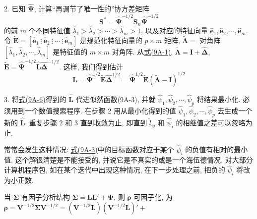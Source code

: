 2. 已知 $\hat{\boldsymbol{\Psi}}$, 计算“再调节了唯一性的”协方差矩阵
\label{eq:9A-5}
\begin{equation}
\mathbf{S}^{*}=\hat{\boldsymbol{\Psi}}^{-1/2}\mathbf{S}_n\hat{\boldsymbol{\Psi}}^{-1/2} \tag{9A-5}
\end{equation}
的前 $m$ 个不同特征值 $\hat{\lambda}_1>\hat{\lambda}_2>\cdots>\hat{\lambda}_m>1$, 以及对应的特征向量 $\hat{\mathbf{e}}_1,\hat{\mathbf{e}}_2,\cdots,\hat{\mathbf{e}}_m$. 令 $\tilde{\mathbf{E}}=[\hat{\mathbf{e}}_1\ \vdots\ \hat{\mathbf{e}}_2\ \vdots\ \cdots\ \vdots\ \hat{\mathbf{e}}_m]$ 是规范化特征向量的 $p\times m$ 矩阵, $\tilde{\boldsymbol{\Lambda}}=$ 对角阵$[\hat{\lambda}_1,\hat{\lambda}_2,\cdots,\hat{\lambda}_m]$ 是特征值的 $m\times m$ 对角阵. 从\hyperref[eq:9A-1]{式(9A-1)}, $\tilde{\boldsymbol{\Lambda}}=\mathbf{I}+\hat{\boldsymbol{\Delta}}$, $\tilde{\mathbf{E}}=\hat{\boldsymbol{\Psi}}^{-1/2}\hat{\mathbf{L}}\hat{\boldsymbol{\Delta}}^{-1/2}$. 这样, 我们得到估计
\label{eq:9A-6}
\begin{equation}
\hat{\mathbf{L}}=\hat{\boldsymbol{\Psi}}^{1/2}\tilde{\mathbf{E}}\hat{\boldsymbol{\Delta}}^{1/2}=\hat{\boldsymbol{\Psi}}^{1/2}\tilde{\mathbf{E}}(\tilde{\boldsymbol{\Lambda}}-\mathbf{I})^{1/2} \tag{9A-6}
\end{equation}

3. 将\hyperref[eq:9A-6]{式(9A-6)}得到的 $\hat{\mathbf{L}}$ 代进似然函数(9A-3), 并就 $\hat{\psi}_1,\hat{\psi}_2,\cdots,\hat{\psi}_p$ 将结果最小化. 必须用到一个数值搜索程序. 在步骤 2 用从最小化得到的值 $\hat{\psi}_1,\hat{\psi}_2,\cdots,\hat{\psi}_p$ 去生成一个新的 $\hat{\mathbf{L}}$. 重复步骤 2 和 3 直到收敛为止, 即直到 $\hat{l}_{ij}$ 和 $\hat{\psi}_i$ 的相继值之差可以忽略为止.

\noindent{}\quad 常常会发生这种情况: \hyperref[eq:9A-3]{式(9A-3)}中的目标函数对应于某个 $\hat{\psi}_i$ 的负值有相对的最小值. 这个解很清楚是不能接受的, 并说它是不真实的或是一个海伍德情况. 对大部分计算机程序包, 如在某个迭代中出现这种情况, 在下一步处理之前, 把负的 $\hat{\psi}_i$ 将改为小正数.


当 $\boldsymbol{\Sigma}$ 有因子分析结构 $\boldsymbol{\Sigma}=\mathbf{L}\mathbf{L}'+\boldsymbol{\Psi}$, 则 $\boldsymbol{\rho}$ 可因子化, 为 $\boldsymbol{\rho}=\mathbf{V}^{-1/2}\boldsymbol{\Sigma}\mathbf{V}^{-1/2}=(\mathbf{V}^{-1/2}\mathbf{L})(\mathbf{V}^{-1/2}\mathbf{L})'+$
